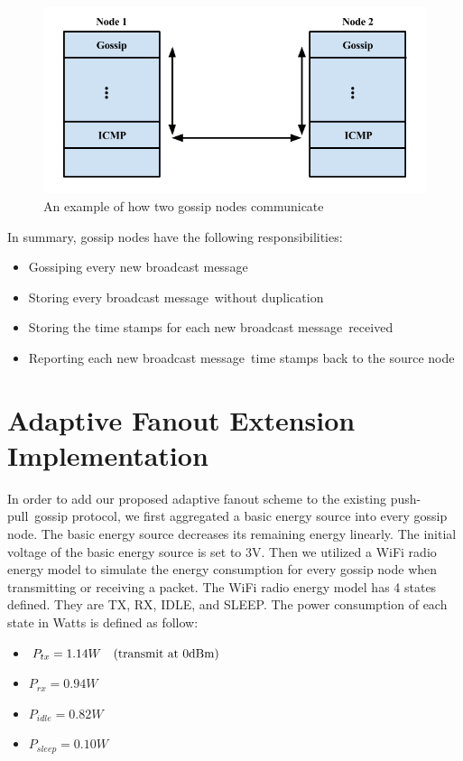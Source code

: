 \documentclass[onehalf,11pt]{beavtex}
\newcommand{\gp}{gossip protocol}
\newcommand{\msg}{message}
\newcommand{\pp}{push-pull}
\begin{document}
\begin{figure}
	\centering
	\includegraphics[width=5.5in]{topDown.png}
	\caption{An example of how two gossip nodes communicate}
	\label{fig:topDown}
\end{figure}

In summary, gossip nodes have the following responsibilities:
\begin{itemize}
	\item Gossiping every new broadcast \msg
	\item Storing every broadcast \msg ~without duplication
	\item Storing the time stamps for each new broadcast \msg ~received 
	\item Reporting each new broadcast \msg ~time stamps back to the source node
\end{itemize}

\section{Adaptive Fanout Extension Implementation}

In order to add our proposed adaptive fanout scheme to the existing \pp ~\gp, we first aggregated a basic energy source into every gossip node. The basic energy source decreases its remaining energy linearly. The initial voltage of the basic energy source is set to 3V. Then we utilized a WiFi radio energy model to simulate the energy consumption for every gossip node when transmitting or receiving a packet. The WiFi radio energy model has 4 states defined. They are TX, RX, IDLE, and SLEEP. The power consumption of each state in Watts is defined as follow:

\begin{itemize}
	\item $P_{tx}=1.14W \mbox{\quad (transmit at 0dBm)}$
	\item $P_{rx}=0.94W$
	\item $P_{idle}=0.82W$
	\item $P_{sleep}=0.10W$
\end{itemize}
\end{document}
